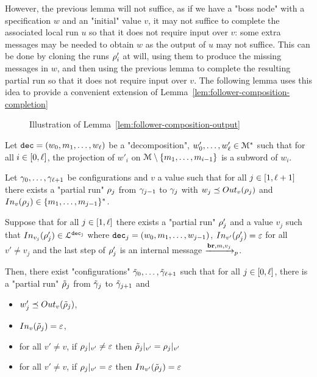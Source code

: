 However, the previous lemma will not suffice, as if we have a "boss node" with a specification $w$ and an "initial" value $v$, it may not suffice to complete the associated local run $u$ so that it does not require input over $v$: some extra messages may be needed to obtain $w$ as the output of $u$ may not suffice. This can be done by cloning the runs $\run_i'$ at will, using them to produce the missing messages in $w$, and then using the previous lemma to complete the resulting partial run so that it does not require input over $v$. The following lemma uses this idea to provide a convenient extension of Lemma~\ref{lem:follower-composition-completion} 

\begin{figure}
	
	\caption{Illustration of Lemma~\ref{lem:follower-composition-output}}
	\label{fig:tree-to-run}
\end{figure}


\begin{lemma}
	\label{lem:follower-composition-output}
	Let $\decsymb = (w_0, m_1, \ldots, w_\ell)$ be a "decomposition", $w'_0, \ldots, w'_\ell \in \messages^*$ such that for all $i \in \nset{0}{\ell}$, the projection of $w'_i$ on $\messages\setminus \set{m_1, \ldots, m_{i-1}}$ is a subword of $w_i$.
	
	Let $\config_0, \ldots, \config_{\ell+1}$ be configurations and $v$ a value such that for all $j \in\nset{1}{\ell+1}$ there exists a "partial run" $\run_j$ from $\config_{j-1}$ to $\config_{j}$ with $w_j \subword \voutput{v}{\run_j}$ and $\vinput{v}{\run_j} \in \set{m_1,\ldots, m_{j-1}}^*$.
	
	Suppose that for all $j \in\nset{1}{\ell}$ there exists a "partial run" $\run'_j$ and a value $v_j$ such that $\vinput{v_j}{\run'_j} \in \langdec{\decsymb_j}$ where $\decsymb_j = (w_0, m_1, \ldots, w_{j-1})$, $\vinput{v'}{\run'_j} = \varepsilon$ for all $v' \neq v_j$ and the last step of $\run'_j$ is an internal message $\intmessage{m}{v_j}$.
	
	Then, there exist "configurations" $\Tilde{\config}_0, \ldots, \Tilde{\config}_{\ell+1}$ such that for all $j \in\nset{0}{\ell}$, there is a "partial run" $\Tilde{\run}_j$ from $\Tilde{\config}_j$ to $\Tilde{\config}_{j+1}$ and
\begin{itemize}
	\item $w'_j \subword \voutput{v}{\Tilde{\run}_j}$, 
	
	\item $\vinput{v}{\Tilde{\run}_j} = \varepsilon$,
	
	\item for all $v' \neq v$, if $\vproj{v'}{\run_j} \neq \varepsilon$ then $\vproj{v'}{\Tilde{\run}_j} = \vproj{v'}{\run_j}$
	
	\item for all $v' \neq v$, if $\vproj{v'}{\run_j} = \varepsilon$ then $\vinput{v'}{\Tilde{\run}_j} = \varepsilon$
\end{itemize}
\end{lemma}

